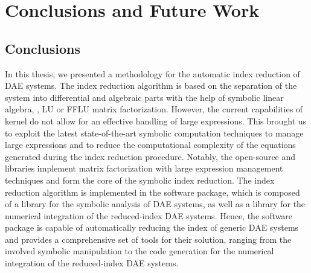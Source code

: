 
\chapter{Conclusions and Future Work}
\label{chap5:conclusions}

\section{Conclusions}

In this thesis, we presented a methodology for the automatic index reduction of \ac{DAE} systems. The index reduction algorithm is based on the separation of the system into differential and algebraic parts with the help of symbolic linear algebra, \ie{}, \ac{LU} or \ac{FFLU} matrix factorization. However, the current capabilities of \Maple{} kernel do not allow for an effective handling of large expressions. This brought us to exploit the latest state-of-the-art symbolic computation techniques to manage large expressions and to reduce the computational complexity of the equations generated during the index reduction procedure. Notably, the open-source \LEM{} and \LAST{} libraries implement matrix factorization with large expression management techniques and form the core of the symbolic index reduction. The index reduction algorithm is implemented in the \Indigo{} software package, which is composed of a \Maple{} library for the symbolic analysis of \ac{DAE} systems, as well as a \Matlab{} library for the numerical integration of the reduced-index \ac{DAE} systems. Hence, the \Indigo{} software package is capable of automatically reducing the index of generic \ac{DAE} systems and provides a comprehensive set of tools for their solution, ranging from the involved symbolic manipulation to the \Matlab{} code generation for the numerical integration of the reduced-index \ac{DAE} systems.

